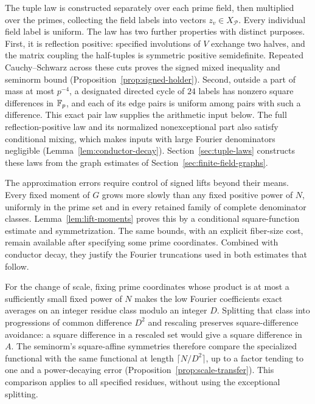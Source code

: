 The tuple law is constructed separately over each prime field, then
multiplied over the primes, collecting the field labels into vectors
$z_v\in X_{\mathcal P}$. Every individual field label is uniform.
The law has two further properties with distinct purposes.
First, it is reflection positive: specified involutions of $V$ exchange
two halves, and the matrix coupling the half-tuples is symmetric positive
semidefinite. Repeated Cauchy--Schwarz across these cuts proves the signed
mixed inequality and seminorm bound
(Proposition~\ref{prop:signed-holder}). Second, outside a part of mass
at most $p^{-4}$, a designated directed cycle of $24$ labels has nonzero
square differences in $\mathbb F_p$, and each of its edge pairs is uniform
among pairs with such a difference. This exact pair law supplies the
arithmetic input below. The full reflection-positive law and its normalized
nonexceptional part also satisfy conditional mixing, which makes inputs
with large Fourier denominators negligible
(Lemma~\ref{lem:conductor-decay}). Section~\ref{sec:tuple-laws} constructs
these laws from the graph estimates of Section~\ref{sec:finite-field-graphs}.

The approximation errors require control of signed lifts beyond their
means. Every fixed moment of $G$ grows more slowly than any fixed positive
power of $N$, uniformly in the prime set and in every retained family of
complete denominator classes. Lemma~\ref{lem:lift-moments} proves this
by a conditional square-function estimate and symmetrization. The same
bounds, with an explicit fiber-size cost, remain available after specifying
some prime coordinates. Combined with conductor decay, they justify the
Fourier truncations used in both estimates that follow.

For the change of scale, fixing prime coordinates whose product is at
most a sufficiently small fixed power of $N$ makes the low Fourier
coefficients exact averages on an integer residue class modulo an integer
$D$. Splitting that class into progressions of common difference $D^2$
and rescaling preserves square-difference avoidance: a square difference
in a rescaled set would give a square difference in $A$.
The seminorm's square-affine symmetries therefore compare the specialized
functional with the same functional at length $\lceil N/D^2\rceil$,
up to a factor tending to one and a power-decaying error
(Proposition~\ref{prop:scale-transfer}). This comparison applies to all
specified residues, without using the exceptional splitting.

